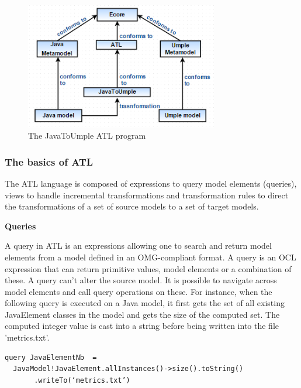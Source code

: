 \begin{figure}[h]
\centering
\includegraphics[width=0.75\textwidth]{Figures/ATL_PROGRAM.png} 
\caption{The JavaToUmple ATL program}
\label{fig:atl}
\end{figure}

\subsubsection{The basics of ATL}

The ATL language is composed of expressions to query model elements (queries), views to handle incremental transformations and transformation rules to direct the transformations of  a set of source models to a set of target models.

\textbf{Queries}

A query in ATL is an expressions allowing one to search and return model elements from a model defined in an OMG-compliant format. A query is an OCL expression that can return primitive values, model elements or a combination of these. A query can’t alter the source model. It is possible to navigate across model elements and call query operations on these. For instance, when the following query is executed on a Java model, it first gets the set of all existing JavaElement classes in the model and gets the size of the computed set. The computed integer value is cast into a string before being written into the file 'metrics.txt'. 

\vspace{\baselineskip}
\begin{lstlisting}[style=umplePlain]
query JavaElementNb  =
  JavaModel!JavaElement.allInstances()->size().toString()
       .writeTo(‘metrics.txt’)
\end{lstlisting}


